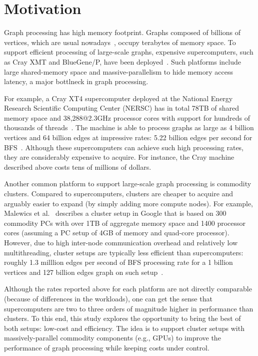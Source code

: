 \section{Motivation}
\label{sec:motivation}

Graph processing has high memory footprint. Graphs composed of billions of vertices, which are usual nowadays~\cite{graph500}, occupy terabytes of memory space. To support efficient processing of large-scale graphs, expensive supercomputers, such as Cray XMT and BlueGene/P, have been deployed~\cite{mizell2009early, yoo2005scalable}. Such platforms include large shared-memory space and massive-parallelism to hide memory access latency, a major bottlneck in graph processing. 

For example, a Cray XT4 supercomputer deployed at the National Energy Research Scientific Computing Center (NERSC) has in total 78TB of shared memory space and 38,288@2.3GHz processor cores with support for hundreds of thousands of threads~\cite{franklin2011cray}. The machine is able to process graphs as large as 4 billion vertices and 64 billion edges at impressive rates: 5.22 billion edges per second for BFS~\cite{graph500}. Although these supercomputers can achieve such high processing rates, they are considerably expensive to acquire. For instance, the Cray machine described above costs tens of millions of dollars.

Another common platform to support large-scale graph processing is commodity clusters. Compared to supercomputers, clusters are cheaper to acquire and arguably easier to expand (by simply adding more compute nodes). For example, Malewics et al.~\cite{Malewicz2009} describes a cluster setup in Google that is based on 300 commodity PCs with over 1TB of aggregate memory space and 1400 processor cores (assuming a PC setup of 4GB of memory and quad-core processor). However, due to high inter-node communication overhead and relatively low multithreading, cluster setups are typically less efficient than supercomputers: roughly 1.3 milllion edges per second of BFS processing rate for a 1 billion vertices and 127 billion edges graph on such setup~\cite{Malewicz2009}.

Although the rates reported above for each platform are not directly comparable (because of differences in the workloads), one can get the sense that supercomputers are two to three orders of magnitude higher in performance than clusters. To this end, this study explores the opportunity to bring the best of both setups: low-cost and efficiency. The idea is to support cluster setups with massively-parallel commodity components (e.g., GPUs) to improve the performance of graph processing while keeping costs under control.
